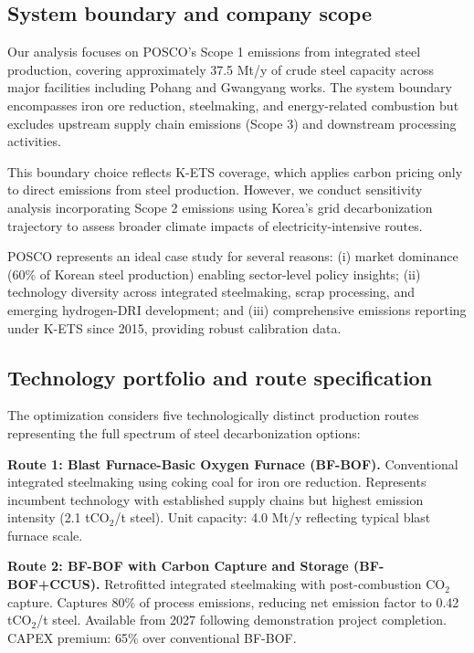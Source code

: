 \documentclass[preprint,1p,authoryear]{elsarticle}
\begin{document}
\subsection{System boundary and company scope}

Our analysis focuses on POSCO's Scope 1 emissions from integrated steel production, covering approximately 37.5 Mt/y of crude steel capacity across major facilities including Pohang and Gwangyang works. The system boundary encompasses iron ore reduction, steelmaking, and energy-related combustion but excludes upstream supply chain emissions (Scope 3) and downstream processing activities.

This boundary choice reflects K-ETS coverage, which applies carbon pricing only to direct emissions from steel production. However, we conduct sensitivity analysis incorporating Scope 2 emissions using Korea's grid decarbonization trajectory to assess broader climate impacts of electricity-intensive routes.

POSCO represents an ideal case study for several reasons: (i) market dominance (60\% of Korean steel production) enabling sector-level policy insights; (ii) technology diversity across integrated steelmaking, scrap processing, and emerging hydrogen-DRI development; and (iii) comprehensive emissions reporting under K-ETS since 2015, providing robust calibration data.

\subsection{Technology portfolio and route specification}

The optimization considers five technologically distinct production routes representing the full spectrum of steel decarbonization options:

\textbf{Route 1: Blast Furnace-Basic Oxygen Furnace (BF-BOF).} Conventional integrated steelmaking using coking coal for iron ore reduction. Represents incumbent technology with established supply chains but highest emission intensity (2.1 tCO$_2$/t steel). Unit capacity: 4.0 Mt/y reflecting typical blast furnace scale.

\textbf{Route 2: BF-BOF with Carbon Capture and Storage (BF-BOF+CCUS).} Retrofitted integrated steelmaking with post-combustion CO$_2$ capture. Captures 80\% of process emissions, reducing net emission factor to 0.42 tCO$_2$/t steel. Available from 2027 following demonstration project completion. CAPEX premium: 65\% over conventional BF-BOF.
\end{document}
